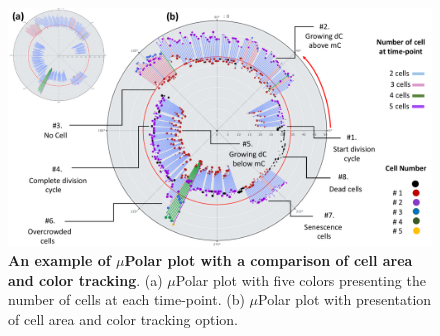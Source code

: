 \documentclass[conference]{IEEEtran}
\begin{document}
\begin{figure}
\centering
\includegraphics[width=\textwidth,height=10 cm]{Patterns/explain.pdf}
\caption{ \textbf{An example of $\mu$Polar plot with a comparison of cell area and color tracking}. (a) $\mu$Polar plot with five colors presenting the number of cells at each time-point. (b) $\mu$Polar plot with presentation of cell area and color tracking option.}
\label{fig:explain}
\end{figure}
\end{document}
